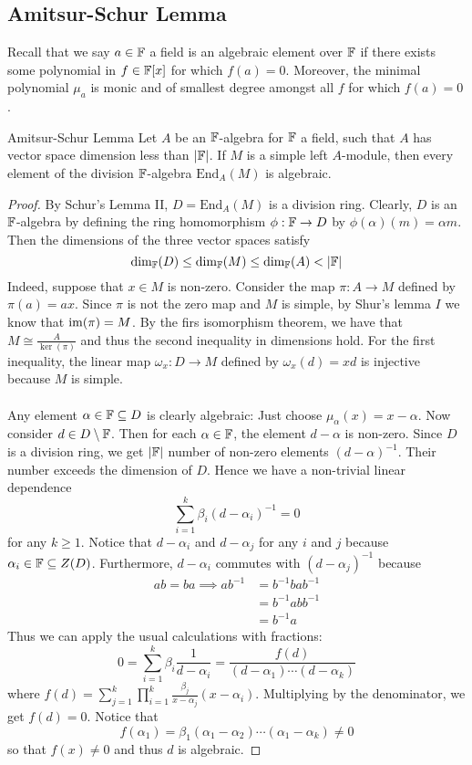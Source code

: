 \documentclass[a4paper]{article}
\begin{document}
\subsection{Amitsur-Schur Lemma}
Recall that we say $a\in\mathbb{F}$ a field is an algebraic element over $\mathbb{F}$ if there exists some polynomial in $f\in\mathbb{F}[x]$ for which $f(a)=0$. Moreover, the minimal polynomial $\mu_a$ is monic and of smallest degree amongst all $f$ for which $f(a)=0$. 

\begin{thm}{Amitsur-Schur Lemma}{} Let $A$ be an $\mathbb{F}$-algebra for $\mathbb{F}$ a field, such that $A$ has vector space dimension less than $\abs{\mathbb{F}}$. If $M$ is a simple left $A$-module, then every element of the division $\mathbb{F}$-algebra $\text{End}_A(M)$ is algebraic. \tcbline
\begin{proof}
By Schur's Lemma II, $D=\text{End}_A(M)$ is a division ring. Clearly, $D$ is an $\mathbb{F}$-algebra by defining the ring homomorphism $\phi:\mathbb{F}\to D$ by $\phi(\alpha)(m)=\alpha m$. Then the dimensions of the three vector spaces satisfy $$\dim_{\mathbb{F}}(D)\leq\dim_{\mathbb{F}}(M)\leq\dim_{\mathbb{F}}(A)<\abs{\mathbb{F}}$$ Indeed, suppose that $x\in M$ is non-zero. Consider the map $\pi:A\to M$ defined by $\pi(a)=ax$. Since $\pi$ is not the zero map and $M$ is simple, by Shur's lemma $I$ we know that $\operatorname{im}(\pi)=M$. By the firs isomorphism theorem, we have that $M\cong\frac{A}{\ker(\pi)}$ and thus the second inequality in dimensions hold. For the first inequality, the linear map $\omega_x:D\to M$ defined by $\omega_x(d)=xd$ is injective because $M$ is simple. \\~\\

Any element $\alpha\in\mathbb{F}\subseteq D$ is clearly algebraic: Just choose $\mu_\alpha(x)=x-\alpha$. Now consider $d\in D\setminus\mathbb{F}$. Then for each $\alpha\in\mathbb{F}$, the element $d-\alpha$ is non-zero. Since $D$ is a division ring, we get $\abs{\mathbb{F}}$ number of non-zero elements $(d-\alpha)^{-1}$. Their number exceeds the dimension of $D$. Hence we have a non-trivial linear dependence $$\sum_{i=1}^k\beta_i(d-\alpha_i)^{-1}=0$$ for any $k\geq 1$. Notice that $d-\alpha_i$ and $d-\alpha_j$ for any $i$ and $j$ because $\alpha_i\in\mathbb{F}\subseteq Z(D)$. Furthermore, $d-\alpha_i$ commutes with $(d-\alpha_j)^{-1}$ because 
\begin{align*}
ab=ba\implies ab^{-1}&=b^{-1}bab^{-1}\\
&=b^{-1}abb^{-1}\\
&=b^{-1}a
\end{align*}
Thus we can apply the usual calculations with fractions: $$0=\sum_{i=1}^k\beta_i\frac{1}{d-\alpha_i}=\frac{f(d)}{(d-\alpha_1)\cdots(d-\alpha_k)}$$ where $f(d)=\sum_{j=1}^k\prod_{i=1}^k\frac{\beta_j}{x-\alpha_j}(x-\alpha_i)$. Multiplying by the denominator, we get $f(d)=0$. Notice that $$f(\alpha_1)=\beta_1(\alpha_1-\alpha_2)\cdots(\alpha_1-\alpha_k)\neq 0$$ so that $f(x)\neq 0$ and thus $d$ is algebraic. 
\end{proof}
\end{thm}
\end{document}
